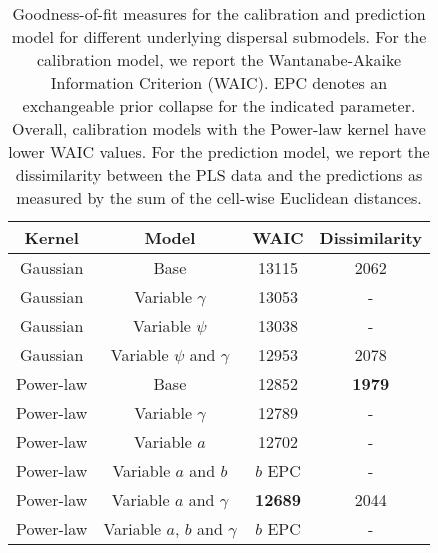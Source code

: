 \begin{table}
\begin{center}
\begin{tabular}{cccc} 
\toprule
Kernel    & Model                          & WAIC           & Dissimilarity \\ \midrule
Gaussian  & Base                           & 13115          & 2062 \\
Gaussian  & Variable $\gamma$              & 13053          &  -   \\
Gaussian  & Variable $\psi$                & 13038          &  -   \\   
Gaussian  & Variable $\psi$ and $\gamma$   & 12953          & 2078 \\
Power-law & Base                           & 12852          & \textbf{1979} \\
Power-law & Variable $\gamma$              & 12789          &  -   \\
Power-law & Variable $a$                   & 12702          &  -   \\
Power-law & Variable $a$ and $b$           & $b$ EPC        &  -   \\
Power-law & Variable $a$ and $\gamma$      & \textbf{12689} & 2044 \\  
Power-law & Variable $a$, $b$ and $\gamma$ & $b$ EPC        &  -   \\
\bottomrule
\end{tabular}
\caption{Goodness-of-fit measures for the calibration and prediction
  model for different underlying dispersal submodels. For the
  calibration model, we report the Wantanabe-Akaike Information
  Criterion (WAIC). EPC denotes an exchangeable prior collapse for the
  indicated parameter. Overall, calibration models with the Power-law
  kernel have lower WAIC values. For the prediction model, we report
  the dissimilarity between the PLS data and the predictions as
  measured by the sum of the cell-wise Euclidean distances.}
\label{table:GOF}
\end{center}
\vspace{2cm}
\end{table}

